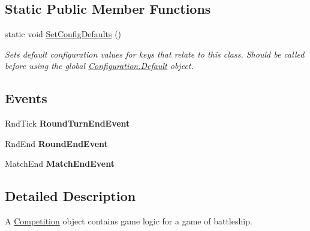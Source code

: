 \subsection*{Static Public Member Functions}
\begin{DoxyCompactItemize}
\item 
\hypertarget{class_m_b_c_1_1_core_1_1_competition_acf765bf2efdcb823da7a7e164b316ce7}{static void \hyperlink{class_m_b_c_1_1_core_1_1_competition_acf765bf2efdcb823da7a7e164b316ce7}{Set\-Config\-Defaults} ()}\label{class_m_b_c_1_1_core_1_1_competition_acf765bf2efdcb823da7a7e164b316ce7}

\begin{DoxyCompactList}\small\item\em Sets default configuration values for keys that relate to this class. Should be called before using the global \hyperlink{class_m_b_c_1_1_core_1_1_configuration_a5db184730b6c51c2ae617d0fc1976c13}{Configuration.\-Default} object.\end{DoxyCompactList}\end{DoxyCompactItemize}
\subsection*{Events}
\begin{DoxyCompactItemize}
\item 
\hypertarget{class_m_b_c_1_1_core_1_1_competition_ab7b3837c19e15f934e926a0c7664c9b1}{Rnd\-Tick {\bfseries Round\-Turn\-End\-Event}}\label{class_m_b_c_1_1_core_1_1_competition_ab7b3837c19e15f934e926a0c7664c9b1}

\item 
\hypertarget{class_m_b_c_1_1_core_1_1_competition_adf9afeb254a4b862106613a6301d4f8e}{Rnd\-End {\bfseries Round\-End\-Event}}\label{class_m_b_c_1_1_core_1_1_competition_adf9afeb254a4b862106613a6301d4f8e}

\item 
\hypertarget{class_m_b_c_1_1_core_1_1_competition_a0188f6329f06caaf50efc3fc3914d9b5}{Match\-End {\bfseries Match\-End\-Event}}\label{class_m_b_c_1_1_core_1_1_competition_a0188f6329f06caaf50efc3fc3914d9b5}

\end{DoxyCompactItemize}


\subsection{Detailed Description}
A \hyperlink{class_m_b_c_1_1_core_1_1_competition}{Competition} object contains game logic for a game of battleship. 

